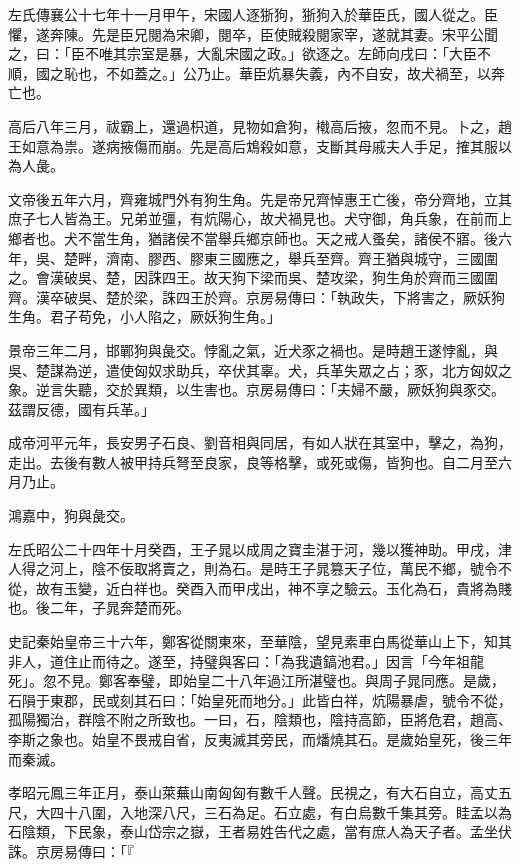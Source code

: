 \begin{pinyinscope}
左氏傳襄公十七年十一月甲午，宋國人逐狾狗，狾狗入於華臣氏，國人從之。臣懼，遂奔陳。先是臣兄閱為宋卿，閱卒，臣使賊殺閱家宰，遂就其妻。宋平公聞之，曰：「臣不唯其宗室是暴，大亂宋國之政。」欲逐之。左師向戌曰：「大臣不順，國之恥也，不如蓋之。」公乃止。華臣炕暴失義，內不自安，故犬禍至，以奔亡也。

高后八年三月，祓霸上，還過枳道，見物如倉狗，橶高后掖，忽而不見。卜之，趙王如意為祟。遂病掖傷而崩。先是高后鴆殺如意，支斷其母戚夫人手足，搉其服以為人彘。

文帝後五年六月，齊雍城門外有狗生角。先是帝兄齊悼惠王亡後，帝分齊地，立其庶子七人皆為王。兄弟並彊，有炕陽心，故犬禍見也。犬守御，角兵象，在前而上鄉者也。犬不當生角，猶諸侯不當舉兵鄉京師也。天之戒人蚤矣，諸侯不寤。後六年，吳、楚畔，濟南、膠西、膠東三國應之，舉兵至齊。齊王猶與城守，三國圍之。會漢破吳、楚，因誅四王。故天狗下梁而吳、楚攻梁，狗生角於齊而三國圍齊。漢卒破吳、楚於梁，誅四王於齊。京房易傳曰：「執政失，下將害之，厥妖狗生角。君子苟免，小人陷之，厥妖狗生角。」

景帝三年二月，邯鄲狗與彘交。悖亂之氣，近犬豕之禍也。是時趙王遂悖亂，與吳、楚謀為逆，遣使匈奴求助兵，卒伏其辜。犬，兵革失眾之占；豕，北方匈奴之象。逆言失聽，交於異類，以生害也。京房易傳曰：「夫婦不嚴，厥妖狗與豕交。茲謂反德，國有兵革。」

成帝河平元年，長安男子石良、劉音相與同居，有如人狀在其室中，擊之，為狗，走出。去後有數人被甲持兵弩至良家，良等格擊，或死或傷，皆狗也。自二月至六月乃止。

鴻嘉中，狗與彘交。

左氏昭公二十四年十月癸酉，王子晁以成周之寶圭湛于河，幾以獲神助。甲戌，津人得之河上，陰不佞取將賣之，則為石。是時王子晁篡天子位，萬民不鄉，號令不從，故有玉變，近白祥也。癸酉入而甲戌出，神不享之驗云。玉化為石，貴將為賤也。後二年，子晁奔楚而死。

史記秦始皇帝三十六年，鄭客從關東來，至華陰，望見素車白馬從華山上下，知其非人，道住止而待之。遂至，持璧與客曰：「為我遺鎬池君。」因言「今年祖龍死」。忽不見。鄭客奉璧，即始皇二十八年過江所湛璧也。與周子晁同應。是歲，石隕于東郡，民或刻其石曰：「始皇死而地分。」此皆白祥，炕陽暴虐，號令不從，孤陽獨治，群陰不附之所致也。一曰，石，陰類也，陰持高節，臣將危君，趙高、李斯之象也。始皇不畏戒自省，反夷滅其旁民，而燔燒其石。是歲始皇死，後三年而秦滅。

孝昭元鳳三年正月，泰山萊蕪山南匈匈有數千人聲。民視之，有大石自立，高丈五尺，大四十八圍，入地深八尺，三石為足。石立處，有白烏數千集其旁。眭孟以為石陰類，下民象，泰山岱宗之嶽，王者易姓告代之處，當有庶人為天子者。孟坐伏誅。京房易傳曰：「『


\end{pinyinscope}
